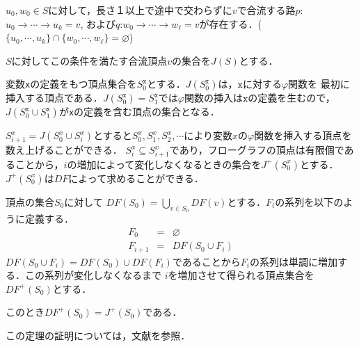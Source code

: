 \documentclass[dvipdfmx,a4j]{jbook}
\begin{document}
\begin{tcolorbox}[title={定義合流条件(S)}]
    $u_0,w_0\in S$に対して，長さ１以上で途中で交わらずに$v$で合流する路$p$:$u_0\rightarrow\cdots\rightarrow u_k=v$,
    および$q$:$w_0\rightarrow\cdots\rightarrow w_\ell=v$が存在する．($\{u_0,\cdots,u_k\}\cap\{w_0,\cdots,w_\ell\}=\varnothing$)
\end{tcolorbox}

$S$に対してこの条件を満たす合流頂点$v$の集合を$J(S)$とする．

変数\verb|x|の定義をもつ頂点集合を$S^{\texttt{x}}_0$とする．$J(S^{\texttt{x}}_0)$は，$\texttt{x}$に対する$\varphi$関数を
最初に挿入する頂点である．$J(S^{\texttt{x}}_0)=S^{\texttt{x}}_1$では$\varphi$関数の挿入は$\texttt{x}$の定義を生むので，
$J(S^{\texttt{x}}_0\cup S^{\texttt{x}}_1)$が\verb|x|の定義を含む頂点の集合となる．

$S^x_{i+1}=J(S^x_0\cup S^x_i)$とすると$S^x_0,S^x_1,S^x_2,\cdots $により変数$x$の$\varphi$関数を挿入する頂点を数え上げることができる．
$S^x_{i}\subseteq S^x_{i+1}$であり，フローグラフの頂点は有限個であることから，$i$の増加によって変化しなくなるときの集合を$J^+(S^x_0)$とする．
$J^+(S^x_0)$は$DF$によって求めることができる．

\begin{Thm}\label{thm:DFlimit}
    頂点の集合$S_0$に対して
    $DF(S_0)=\bigcup_{v\in S_0}DF(v)$とする．$F_i$の系列を以下のように定義する．
    \begin{eqnarray*}
        F_0 & = & \varnothing\\
        F_{i+1} & = & DF(S_0\cup F_i)
    \end{eqnarray*}
    $DF(S_0\cup F_i)=DF(S_0)\cup DF(F_i)$であることから$F_i$の系列は単調に増加する．この系列が変化しなくなるまで
    $i$を増加させて得られる頂点集合を$DF^+(S_0)$とする．

    このとき$DF^+(S_0)=J^+(S_0)$である．
\end{Thm}

この定理の証明については，文献\cite{DBLP:journals/toplas/CytronFRWZ91}を参照．
\end{document}
